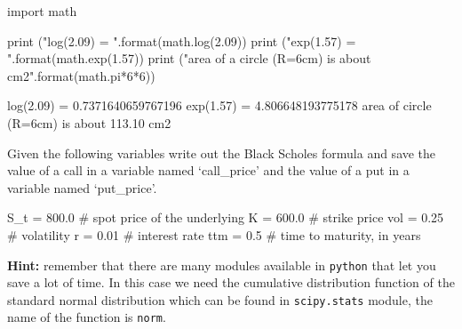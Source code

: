 \cprotEnv \begin{solution}
\begin{ipython}
import math

print ("log(2.09) = {}".format(math.log(2.09))
print ("exp(1.57) = {}".format(math.exp(1.57))
print ("area of a circle (R=6cm) is about {} cm2".format(math.pi*6*6))

log(2.09) = 0.7371640659767196
exp(1.57) = 4.806648193775178
area of circle (R=6cm) is about 113.10 cm2
\end{ipython}
\end{solution}

\cprotEnv \begin{question}
Given the following variables write out the Black Scholes formula and save the value of a call in a variable named `call\_price' and the value of a put in a variable named `put\_price'.

\begin{ipython}
S_t = 800.0 # spot price of the underlying
K = 600.0 # strike price
vol = 0.25 # volatility
r = 0.01 # interest rate
ttm = 0.5 # time to maturity, in years
\end{ipython}
\textbf{Hint:} remember that there are many modules available in \texttt{python} that let you save a lot of time. In this case we need the cumulative distribution function of the standard normal distribution which can be found in \texttt{scipy.stats} module, the name of the function is \texttt{norm}.
\end{question}

